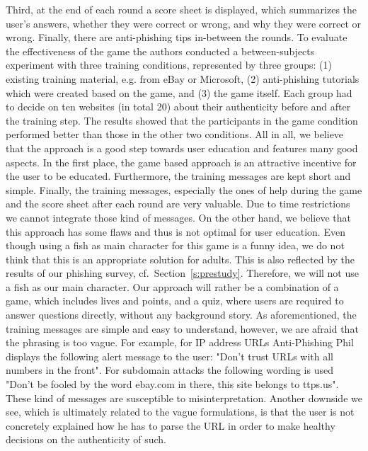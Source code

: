 Third, at the end of each round a score sheet is displayed, which summarizes the user's answers, whether they were correct or wrong, and why they were correct or wrong. 
Finally, there are anti-phishing tips in-between the rounds. \newline
To evaluate the effectiveness of the game the authors conducted a between-subjects experiment with three training conditions, represented by three groups: 
(1) existing training material, e.g. from eBay or Microsoft, (2) anti-phishing tutorials which were created based on the game, and (3) the game itself. 
Each group had to decide on ten websites (in total 20) about their authenticity before and after the training step. 
The results showed that the participants in the game condition performed better than those in the other two conditions. 
All in all, we believe that the approach is a good step towards user education and features many good aspects. 
In the first place, the game based approach is an attractive incentive for the user to be educated. 
Furthermore, the training messages are kept short and simple. 
Finally, the training messages, especially the ones of help during the game and the score sheet after each round are very valuable. 
Due to time restrictions we cannot integrate those kind of messages. \newline
On the other hand, we believe that this approach has some flaws and thus is not optimal for user education. 
Even though using a fish as main character for this game is a funny idea, we do not think that this is an appropriate solution for adults. 
This is also reflected by the results of our phishing survey, cf.~Section~\autoref{s:prestudy}. 
Therefore, we will not use a fish as our main character. 
Our approach will rather be a combination of a game, which includes lives and points, and a quiz, where users are required to answer questions directly, without any background story.
As aforementioned, the training messages are simple and easy to understand, however, we are afraid that the phrasing is too vague. 
For example, for IP address URLs Anti-Phishing Phil displays the following alert message to the user: 
"Don't trust URLs with all numbers in the front". 
For subdomain attacks the following wording is used "Don't be fooled by the word ebay.com in there, this site belongs to ttps.us". 
These kind of messages are susceptible to misinterpretation. 
Another downside we see, which is ultimately related to the vague formulations, is that the user is not concretely explained how he has to parse the URL in order to make healthy decisions on the authenticity of such. 
